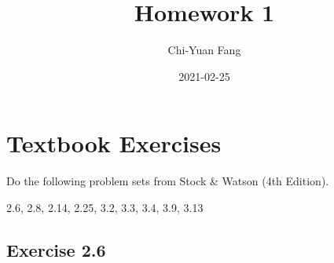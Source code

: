 \documentclass[
]{book}
\title{Homework 1}
\author{Chi-Yuan Fang}
\date{2021-02-25}
\begin{document}
\maketitle

{
\setcounter{tocdepth}{1}
\tableofcontents
}
\hypertarget{textbook-exercises}{%
\chapter{Textbook Exercises}\label{textbook-exercises}}

Do the following problem sets from Stock \& Watson (4th Edition).

2.6, 2.8, 2.14, 2.25, 3.2, 3.3, 3.4, 3.9, 3.13

\hypertarget{exercise-2.6}{%
\section{Exercise 2.6}\label{exercise-2.6}}
\end{document}
